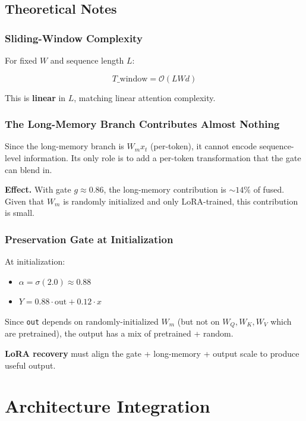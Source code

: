 \subsection{Theoretical Notes}

\subsubsection{Sliding-Window Complexity}

For fixed $W$ and sequence length $L$:

\[
T\_\text{window} = \mathcal{O}(L W d)
\tag{4.12}
\]

This is \textbf{linear} in $L$, matching linear attention complexity.

\subsubsection{The Long-Memory Branch Contributes Almost Nothing}

Since the long-memory branch is $W_m x_t$ (per-token), it cannot encode 
sequence-level information. Its only role is to add a per-token 
transformation that the gate can blend in.

\textbf{Effect.} With gate $g \approx 0.86$, the long-memory contribution is 
$\sim 14\%$ of fused. Given that $W_m$ is randomly initialized and only 
LoRA-trained, this contribution is small.

\subsubsection{Preservation Gate at Initialization}

At initialization:
\begin{itemize}
\item $\alpha = \sigma(2.0) \approx 0.88$
\item $Y = 0.88 \cdot \text{out} + 0.12 \cdot x$

\end{itemize}
Since \texttt{out} depends on randomly-initialized $W_m$ (but not on $W_Q, W_K, W_V$ 
which are pretrained), the output has a mix of pretrained + random.

\textbf{LoRA recovery} must align the gate + long-memory + output scale to 
produce useful output.




\section{Architecture Integration}

